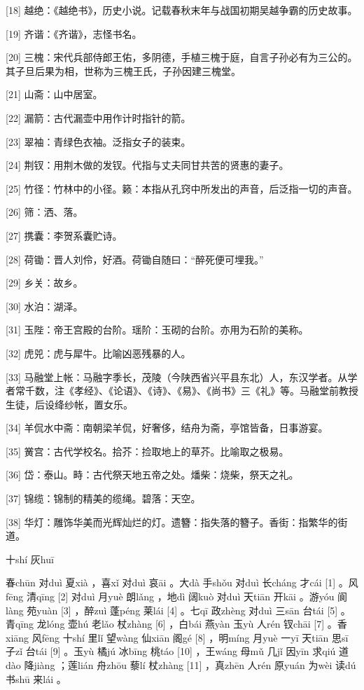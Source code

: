 \documentclass[12pt,UTF8]{ctexbook}
\begin{document}
[18] 越绝：《越绝书》，历史小说。记载春秋末年与战国初期吴越争霸的历史故事。

[19] 齐谐：《齐谐》，志怪书名。

[20] 三槐：宋代兵部侍郎王佑，多阴德，手植三槐于庭，自言子孙必有为三公的。其子旦后果为相，世称为三槐王氏，子孙因建三槐堂。

[21] 山斋：山中居室。

[22] 漏箭：古代漏壶中用作计时指针的箭。

[23] 翠袖：青绿色衣袖。泛指女子的装束。

[24] 荆钗：用荆木做的发钗。代指与丈夫同甘共苦的贤惠的妻子。

[25] 竹径：竹林中的小径。籁：本指从孔窍中所发出的声音，后泛指一切的声音。

[26] 筛：洒、落。

[27] 携囊：李贺系囊贮诗。

[28] 荷锄：晋人刘伶，好酒。荷锄自随曰：“醉死便可埋我。”

[29] 乡关：故乡。

[30] 水泊：湖泽。

[31] 玉陛：帝王宫殿的台阶。瑶阶：玉砌的台阶。亦用为石阶的美称。

[32] 虎兕：虎与犀牛。比喻凶恶残暴的人。

[33] 马融堂上帐：马融字季长，茂陵（今陕西省兴平县东北）人，东汉学者。从学者常千数，注《孝经》、《论语》、《诗》、《易》、《尚书》三《礼》等。马融堂前教授生徒，后设绛纱帐，置女乐。

[34] 羊侃水中斋：南朝梁羊侃，好奢侈，结舟为斋，亭馆皆备，日事游宴。

[35] 黉宫：古代学校名。拾芥：捡取地上的草芥。比喻取之极易。

[36] 岱：泰山。畤：古代祭天地五帝之处。燔柴：烧柴，祭天之礼。

[37] 锦缆：锦制的精美的缆绳。碧落：天空。

[38] 华灯：雕饰华美而光辉灿烂的灯。遗簪：指失落的簪子。香街：指繁华的街道。





十shí 灰huī


春chūn 对duì 夏xià ，喜xǐ 对duì 哀āi 。大dà 手shǒu 对duì 长cháng 才cái [1] 。风fēng 清qīng [2] 对duì 月yuè 朗lǎng ，地dì 阔kuò 对duì 天tiān 开kāi 。游yóu 阆làng 苑yuàn [3] ，醉zuì 蓬péng 莱lái [4] 。七qī 政zhèng 对duì 三sān 台tái [5] 。青qīng 龙lóng 壶hú 老lǎo 杖zhàng [6] ，白bái 燕yàn 玉yù 人rén 钗chāi [7] 。香xiāng 风fēng 十shí 里lǐ 望wàng 仙xiān 阁gé [8] ，明míng 月yuè 一yī 天tiān 思sī 子zǐ 台tái [9] 。玉yù 橘jú 冰bīng 桃táo [10] ，王wáng 母mǔ 几jǐ 因yīn 求qiú 道dào 降jiàng ；莲lián 舟zhōu 藜lí 杖zhàng [11] ，真zhēn 人rén 原yuán 为wèi 读dú 书shū 来lái 。
\end{document}
